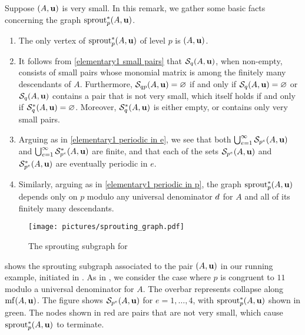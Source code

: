 \documentclass{amsart}
\begin{document}
\begin{remark}
   \label{elementary2: R}
   Suppose $(A,\mathbf{u})$ is very small.
   In this remark, we gather some basic facts concerning the graph $\operatorname{sprout}^{\ast}_p(A,\mathbf{u})$.
   \begin{enumerate}
      \item  \label{elementary2 lowest level}
      The only vertex of $\operatorname{sprout}_p^{\ast}(A,\mathbf{u})$ of level $p$ is $(A,\mathbf{u})$.
      \item \label{elementary2 small pairs}
      It follows from \eqref{elementary1 small pairs} that $\mathcal{S}_{q}(A,\mathbf{u})$, when non-empty, consists of small pairs whose monomial matrix is among the finitely many descendants of $A$.
      Furthermore, $\mathcal{S}_{qp}(A,\mathbf{u}) = \varnothing$ if and only if $\mathcal{S}_q(A,\mathbf{u}) = \varnothing$ or $\mathcal{S}_q(A,\mathbf{u})$ contains a pair that is not very small, which itself holds if and only if $\mathcal{S}_{q}^{\ast}(A,\mathbf{u})= \varnothing$.
      Moreover, $\mathcal{S}_q^{\ast}(A,\mathbf{u})$ is either empty, or contains only very small pairs.
      \item \label{elementary2 periodic in e}
      Arguing as in \eqref{elementary1 periodic in e}, we see that both $\bigcup_{e=1}^{\infty} \mathcal{S}_{p^e}(A,\mathbf{u})$ and  $\bigcup_{e=1}^{\infty} \mathcal{S}^{\ast}_{p^e}(A,\mathbf{u})$ are finite, and that each of the sets $\mathcal{S}_{p^e}(A,\mathbf{u})$ and $\mathcal{S}^{\ast}_{p^e}(A,\mathbf{u})$ are eventually periodic in $e$.
      \item \label{elementary2 periodic in p}
      Similarly, arguing as in \eqref{elementary1 periodic in p}, the graph $\operatorname{sprout}_p^{\ast}(A,\mathbf{u})$ depends only on $p$ modulo any universal denominator $d$ for $A$  and all of its finitely many descendants.
   \end{enumerate}
\end{remark}

\begin{example}
   \label{ex: ft.4}
   \begin{figure}
      \centering
      \texttt{[image: pictures/sprouting\_graph.pdf]}
      \caption{The sprouting subgraph for }
      \label{fig: sprouting graph}
   \end{figure}
    shows the sprouting subgraph associated to the pair $(A,\mathbf{u})$ in our running example, initiated in .
   As in , we consider the case where $p$ is congruent to $11$ modulo a universal denominator for $A$.
   The overbar represents collapse along $\operatorname{mf}(A,\mathbf{u})$.
   The figure shows $\mathcal{S}_{p^e}(A,\mathbf{u})$ for $e=1,\ldots,4$, with $\operatorname{sprout}^*_p(A,\mathbf{u})$ shown in green.
   The nodes shown in red are pairs that are not very small, which cause $\operatorname{sprout}^*_p(A,\mathbf{u})$ to terminate.


\end{example}
\end{document}
